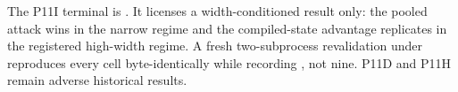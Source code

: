 {}The P11I terminal is . It licenses a width-conditioned result only: the pooled attack wins in the narrow regime and the compiled-state advantage replicates in the registered high-width regime. A fresh two-subprocess revalidation under  reproduces every cell byte-identically while recording , not nine. P11D and P11H remain adverse historical results.
\markdownRendererSectionEnd 
\markdownRendererSectionEnd \markdownRendererDocumentEnd
